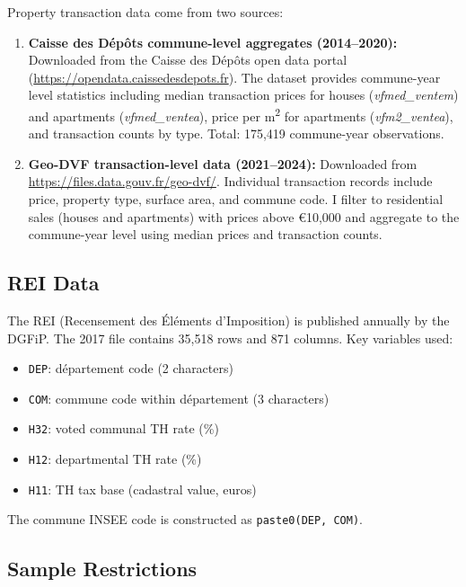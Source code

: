 \documentclass[12pt]{article}
\begin{document}
Property transaction data come from two sources:

\begin{enumerate}
    \item \textbf{Caisse des D\'{e}p\^{o}ts commune-level aggregates (2014--2020):} Downloaded from the Caisse des D\'{e}p\^{o}ts open data portal (\url{https://opendata.caissedesdepots.fr}). The dataset provides commune-year level statistics including median transaction prices for houses (\emph{vfmed\_ventem}) and apartments (\emph{vfmed\_ventea}), price per m\textsuperscript{2} for apartments (\emph{vfm2\_ventea}), and transaction counts by type. Total: 175,419 commune-year observations.

    \item \textbf{Geo-DVF transaction-level data (2021--2024):} Downloaded from \url{https://files.data.gouv.fr/geo-dvf/}. Individual transaction records include price, property type, surface area, and commune code. I filter to residential sales (houses and apartments) with prices above \euro{}10,000 and aggregate to the commune-year level using median prices and transaction counts.
\end{enumerate}

\subsection{REI Data}

The REI (Recensement des \'{E}l\'{e}ments d'Imposition) is published annually by the DGFiP. The 2017 file contains 35,518 rows and 871 columns. Key variables used:
\begin{itemize}
    \item \texttt{DEP}: d\'{e}partement code (2 characters)
    \item \texttt{COM}: commune code within d\'{e}partement (3 characters)
    \item \texttt{H32}: voted communal TH rate (\%)
    \item \texttt{H12}: departmental TH rate (\%)
    \item \texttt{H11}: TH tax base (cadastral value, euros)
\end{itemize}

The commune INSEE code is constructed as \texttt{paste0(DEP, COM)}.

\subsection{Sample Restrictions}
\end{document}
